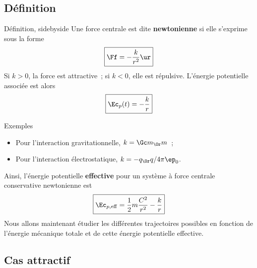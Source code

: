 \documentclass[../main/main.tex]{subfiles}
\begin{document}
\subsection{Définition}
\begin{tdefi}{Définition, sidebyside}
    Une force centrale est dite \textbf{newtonienne} si elle s'exprime sous la
    forme
    \[\boxed{\Ff = -\frac{k}{r^2}\ur}\]
    Si $k>0$, la force est attractive~; si $k<0$, elle est répulsive.
    \tcblower
    L'énergie potentielle associée est alors
    \[\boxed{\Ec_p(t) = -\frac{k}{r}}\]
\end{tdefi}
\begin{rexem}{Exemples}
    \begin{itemize}
        \item Pour l'interaction gravitationnelle, $k = \Gc m_\Or m$~;
        \item Pour l'interaction électrostatique, $k = -q_\Or q/4\pi\ep_0$.
    \end{itemize}
\end{rexem}

Ainsi, l'énergie potentielle \textbf{effective} pour un système à force centrale
conservative newtonienne est
\[\boxed{\Ec_{p,\rm eff} = \frac{1}{2}m\frac{C^2}{r^2} - \frac{k}{r}}\]
Nous allons maintenant étudier les différentes trajectoires possibles en
fonction de l'énergie mécanique totale et de cette énergie potentielle
effective.

\subsection{Cas attractif}
\end{document}
